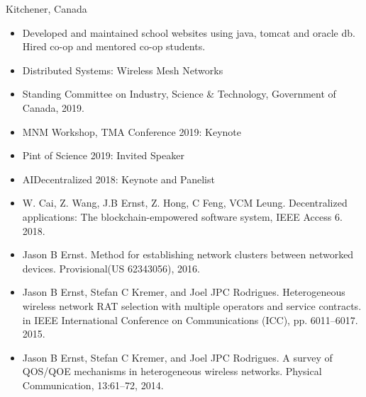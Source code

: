\documentclass[10pt,a4paper,ragged2e,withhyper]{altacv}
\begin{document}
\begin{paracol}{2}
 {Kitchener, Canada}
\begin{itemize}
\item Developed and maintained school websites using java, tomcat and oracle db. Hired co-op and mentored co-op students.
\end{itemize}



\divider

\switchcolumn

\begin{itemize}
    \item Distributed Systems: Wireless Mesh Networks
\end{itemize}
\smallskip

\smallskip
\begin{itemize}
    \item Standing Committee on Industry, Science \& Technology, Government of Canada, 2019.
    \item MNM Workshop, TMA Conference 2019: Keynote
    \item Pint of Science 2019: Invited Speaker
    \item AIDecentralized 2018: Keynote and Panelist
\end{itemize}

\smallskip
\begin{itemize}
\item W. Cai, Z. Wang, J.B Ernst, Z. Hong, C Feng, VCM Leung. Decentralized applications: The blockchain-empowered software system, IEEE Access 6. 2018.
\item Jason B Ernst. Method for establishing network clusters between networked devices. Provisional(US 62343056), 2016.
\item Jason B Ernst, Stefan C Kremer, and Joel JPC Rodrigues. Heterogeneous wireless network RAT selection with multiple operators and service contracts. in IEEE International Conference on Communications (ICC), pp. 6011–6017. 2015.
\item Jason B Ernst, Stefan C Kremer, and Joel JPC Rodrigues. A survey of QOS/QOE mechanisms in heterogeneous wireless networks. Physical Communication, 13:61–72, 2014.
\end{itemize}



\end{paracol}
\end{document}
